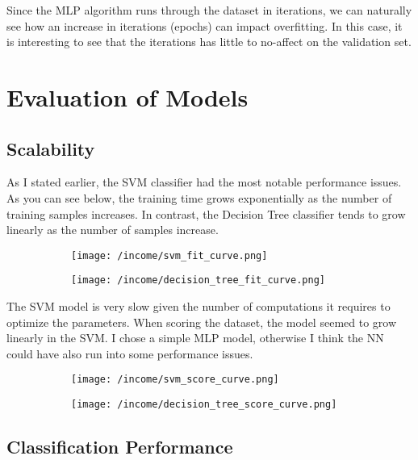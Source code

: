 \documentclass[12pt]{article}
\begin{document}
Since the MLP algorithm runs through the dataset in iterations, we can naturally see how an increase in iterations (epochs) can impact overfitting. In this case, it is interesting to see that the iterations has little to no-affect on the validation set.

\section{Evaluation of Models}
\subsection*{Scalability}
As I stated earlier, the SVM classifier had the most notable performance issues. As you can see below, the training time grows exponentially as the number of training samples increases. In contrast, the Decision Tree classifier tends to 
grow linearly as the number of samples increase.

\begin{figure}[H]
\begin{subfigure}{0.5\textwidth}
\centering
\texttt{[image: /income/svm\_fit\_curve.png]}
\end{subfigure}%
\begin{subfigure}{0.5\textwidth}
\centering
\texttt{[image: /income/decision\_tree\_fit\_curve.png]}
\end{subfigure}
\end{figure}

The SVM model is very slow given the number of computations it requires to optimize the parameters. When scoring the dataset, the model seemed to grow linearly in the SVM. I chose a simple MLP model, otherwise I think the NN could have also run into some performance issues. 

\begin{figure}[H]
\begin{subfigure}{0.5\textwidth}
\centering
\texttt{[image: /income/svm\_score\_curve.png]}
\end{subfigure}%
\begin{subfigure}{0.5\textwidth}
\centering
\texttt{[image: /income/decision\_tree\_score\_curve.png]}
\end{subfigure}
\end{figure}


\subsection*{Classification Performance}
\end{document}
